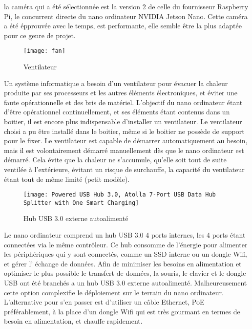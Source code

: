 \par la caméra qui a été sélectionnée est la version 2 de celle du fournisseur Raspberry Pi, le concurrent directe du nano ordinateur NVIDIA Jetson Nano. Cette caméra a été épprouvée avec le temps, est performante, elle semble être la plus adaptée pour ce genre de projet. 
\begin{figure}[H]
    \centering
    \texttt{[image: fan]}
    \caption{Ventilateur}
    \label{fig:fan}
\end{figure}
\par Un système informatique a besoin d'un ventilateur pour évacuer la chaleur produite par ses processeurs et les autres éléments électroniques, et éviter une faute opérationnelle et des bris de matériel. L'objectif du nano ordinateur étant d'être opérationnel continuellement, et ses éléments étant contenus dans un boitier, il est encore plus indispensable d'installer un ventilateur. Le ventilateur choisi a pu être installé dans le boitier, même si le boitier ne possède de support pour le fixer. Le ventilateur est capable de démarrer automatiquement au besoin, mais il est volontairement démarré manuellement dès que le nano ordinateur est démarré. Cela évite que la chaleur ne s'accumule, qu'elle soit tout de suite ventilée à l'extérieure, évitant un risque de surchauffe, la capacité du ventilateur étant tout de même limité (petit modèle).
\begin{figure}[H]
    \centering
    \texttt{[image: Powered USB Hub 3.0, Atolla 7-Port USB Data Hub Splitter with One Smart Charging]}
    \caption{Hub USB 3.0 externe autoalimenté}
    \label{fig:hubusb}
\end{figure}
\par Le nano ordinateur comprend un hub USB 3.0 4 ports internes, les 4 ports étant connectées via le même contrôleur. Ce hub consomme de l'énergie pour alimenter les périphériques qui y sont connectés, comme un SSD interne ou un dongle Wifi, et gérer l’ échange de données. Afin de minimiser les besoins en alimentation et optimiser le plus possible le transfert de données, la souris, le clavier et le dongle USB ont été branchés a un hub USB 3.0 externe autoalimenté. Malheureusement cette option complexifie le déploiement sur le terrain du nano ordinateur. L'alternative pour s'en passer est d'utiliser un câble Ethernet, PoE préférablement, à la place d'un dongle Wifi qui est très gourmant en termes de besoin en alimentation, et chauffe rapidement.

